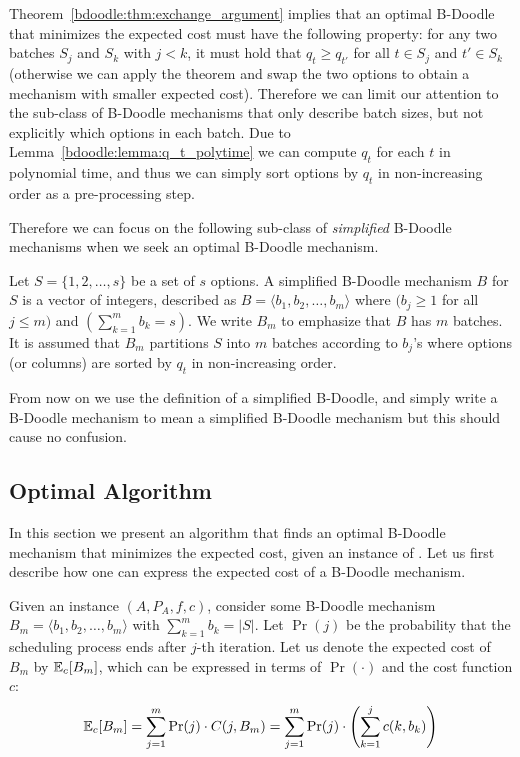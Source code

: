 	Theorem~\ref{bdoodle:thm:exchange_argument} implies that an optimal B-Doodle that minimizes the expected cost must have the following property: for any two batches $S_j$ and $S_k$ with $j < k$, it must hold that $q_t \geq q_{t'}$ for all $t\in S_j$ and $t' \in S_k$ (otherwise we can apply the theorem and swap the two options to obtain a mechanism with smaller expected cost).
	Therefore we can limit our attention to the sub-class of B-Doodle mechanisms that only describe batch sizes, but not explicitly which options in each batch. Due to Lemma~\ref{bdoodle:lemma:q_t_polytime} we can compute $q_t$ for each $t$ in polynomial time, and thus we can simply sort options by $q_t$ in non-increasing order as a pre-processing step.

	Therefore we can focus on the following sub-class of \emph{simplified} B-Doodle mechanisms when we seek an optimal B-Doodle mechanism.
	\begin{definition}
	Let $S = \{1, 2, \dots, s\}$ be a set of $s$ options.
	A simplified B-Doodle mechanism $B$ for $S$ is a vector of integers, described as $B = \langle b_1, b_2, \dots, b_m\rangle$ where $(b_j \geq 1$ for all $j \leq m)$ and $(\sum_{k=1}^{m} b_k = s)$.
	We write $B_m$ to emphasize that $B$ has $m$ batches. It is assumed that $B_m$ partitions $S$ into $m$ batches according to $b_j$'s where options (or columns) are sorted by $q_t$ in non-increasing order.
	\end{definition}
	From now on we use the definition of a simplified B-Doodle, and simply write a B-Doodle mechanism to mean a simplified B-Doodle mechanism but this should cause no confusion.


\subsection{Optimal Algorithm} \label{bdoodle:sec:Algorithm}

	In this section we present an algorithm that finds an optimal B-Doodle mechanism that minimizes the expected cost, given an instance of \BDP.
	Let us first describe how one can express the expected cost of a B-Doodle mechanism.

	Given an instance $(A, P_A, f, c)$, consider some B-Doodle mechanism $B_{m} = \langle b_1, b_2, \dots, b_m \rangle$ with $\sum_{k=1}^{m} b_k = |S|$. Let $\Pr(j)$ be the probability that the scheduling process ends after $j$-th iteration. Let us denote the expected cost of $B_{m}$ by $\mathbb{E}_c[B_{m}]$, which can be expressed in terms of $\Pr(\cdot)$ and the cost function $c$:
	\begin{equation} \label{bdoodle:eqn:expCost}
		\mathbb{E}_c[B_{m}] = \sum_{j=1}^{m} \Pr(j) \cdot C(j, B_{m})  =  \sum_{j=1}^{m} \Pr(j) \cdot \left(\sum_{k=1}^{j} c(k, b_k)\right)
	\end{equation}%

